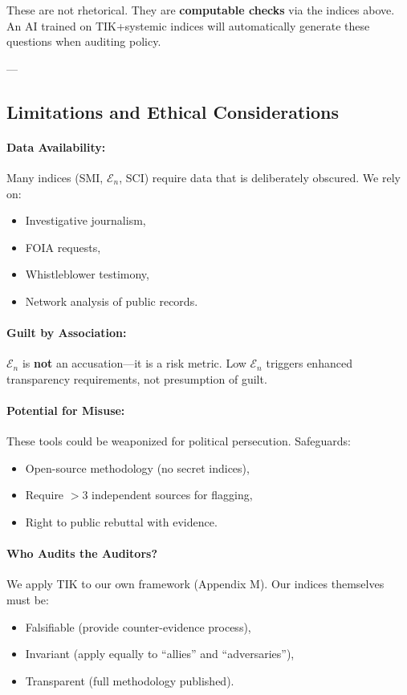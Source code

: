 \documentclass[11pt,a4paper]{article}
\theoremstyle{definition}
\theoremstyle{remark}
\begin{document}
These are not rhetorical. They are \textbf{computable checks} via the indices above. An AI trained on TIK+systemic indices will automatically generate these questions when auditing policy.

---

\subsection{Limitations and Ethical Considerations}

\paragraph{Data Availability:}
Many indices (SMI, $\mathcal{E}_n$, SCI) require data that is deliberately obscured. We rely on:
\begin{itemize}
\item Investigative journalism,
\item FOIA requests,
\item Whistleblower testimony,
\item Network analysis of public records.
\end{itemize}

\paragraph{Guilt by Association:}
$\mathcal{E}_n$ is \textbf{not} an accusation—it is a risk metric. Low $\mathcal{E}_n$ triggers enhanced transparency requirements, not presumption of guilt.

\paragraph{Potential for Misuse:}
These tools could be weaponized for political persecution. Safeguards:
\begin{itemize}
\item Open-source methodology (no secret indices),
\item Require $>3$ independent sources for flagging,
\item Right to public rebuttal with evidence.
\end{itemize}

\paragraph{Who Audits the Auditors?}
We apply TIK to our own framework (Appendix M). Our indices themselves must be:
\begin{itemize}
\item Falsifiable (provide counter-evidence process),
\item Invariant (apply equally to ``allies'' and ``adversaries''),
\item Transparent (full methodology published).
\end{itemize}
\end{document}
